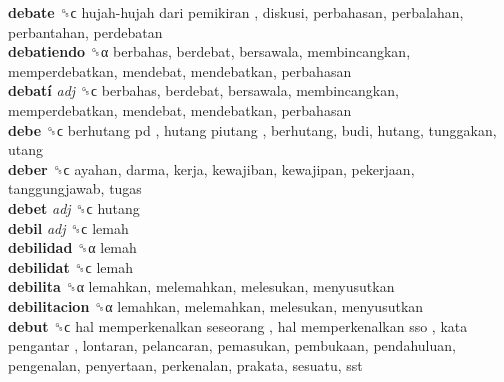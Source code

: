 \textbf{debate} ␝ϲ   hujah-hujah dari pemikiran , diskusi, perbahasan, perbalahan, perbantahan, perdebatan  \\
\textbf{debatiendo} ␝α  berbahas, berdebat, bersawala, membincangkan, memperdebatkan, mendebat, mendebatkan, perbahasan  \\
\textbf{debatí} \emph{adj}  ␝ϲ  berbahas, berdebat, bersawala, membincangkan, memperdebatkan, mendebat, mendebatkan, perbahasan  \\
\textbf{debe} ␝ϲ   berhutang pd ,  hutang piutang , berhutang, budi, hutang, tunggakan, utang  \\
\textbf{deber} ␝ϲ  ayahan, darma, kerja, kewajiban, kewajipan, pekerjaan, tanggungjawab, tugas  \\
\textbf{debet} \emph{adj}  ␝ϲ  hutang  \\
\textbf{debil} \emph{adj}  ␝ϲ  lemah  \\
\textbf{debilidad} ␝α  lemah  \\
\textbf{debilidat} ␝ϲ  lemah  \\
\textbf{debilita} ␝α  lemahkan, melemahkan, melesukan, menyusutkan  \\
\textbf{debilitacion} ␝α  lemahkan, melemahkan, melesukan, menyusutkan  \\
\textbf{debut} ␝ϲ   hal memperkenalkan seseorang ,  hal memperkenalkan sso ,  kata pengantar , lontaran, pelancaran, pemasukan, pembukaan, pendahuluan, pengenalan, penyertaan, perkenalan, prakata, sesuatu, sst  \\

